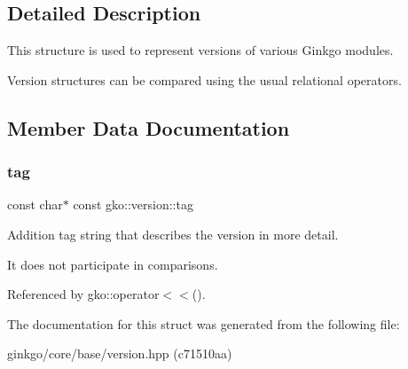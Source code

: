 \subsection{Detailed Description}
This structure is used to represent versions of various Ginkgo modules. 

Version structures can be compared using the usual relational operators. 

\subsection{Member Data Documentation}
\mbox{\label{structgko_1_1version_a1bd0eaa4d551c145ff9cd0c10e555ac3}} 
\subsubsection{\texorpdfstring{tag}{tag}}
{\footnotesize\ttfamily const char$\ast$ const gko\+::version\+::tag}



Addition tag string that describes the version in more detail. 

It does not participate in comparisons. 

Referenced by gko\+::operator$<$$<$().



The documentation for this struct was generated from the following file\+:\begin{DoxyCompactItemize}
\item 
ginkgo/core/base/version.\+hpp (c71510aa)\end{DoxyCompactItemize}
